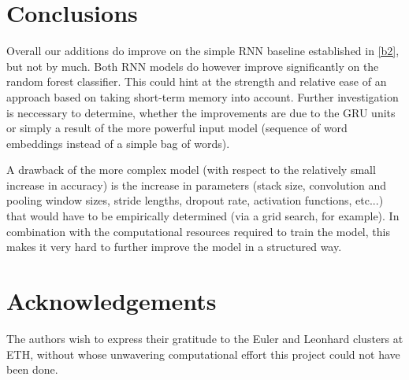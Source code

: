 \documentclass[10pt,conference,compsocconf]{IEEEtran}
\begin{document}
\section*{Conclusions}

Overall our additions do improve on the simple RNN baseline
established in \autoref{b2}, but not by much. Both RNN models do
however improve significantly on the random forest classifier. This
could hint at the strength and relative ease of an approach based on
taking short-term memory into account. Further investigation is
neccessary to determine, whether the improvements are due to the GRU
units or simply a result of the more powerful input model (sequence of
word embeddings instead of a simple bag of words).

A drawback of the more complex model (with respect to the relatively
small increase in accuracy) is the increase in parameters (stack size,
convolution and pooling window sizes, stride lengths, dropout rate,
activation functions, etc...) that would have to be empirically
determined (via a grid search, for example). In combination with the
computational resources required to train the model, this makes it
very hard to further improve the model in a structured way.

\section*{Acknowledgements}

The authors wish to express their gratitude to the Euler and Leonhard
clusters at ETH, without whose unwavering computational effort this
project could not have been done.



\end{document}
